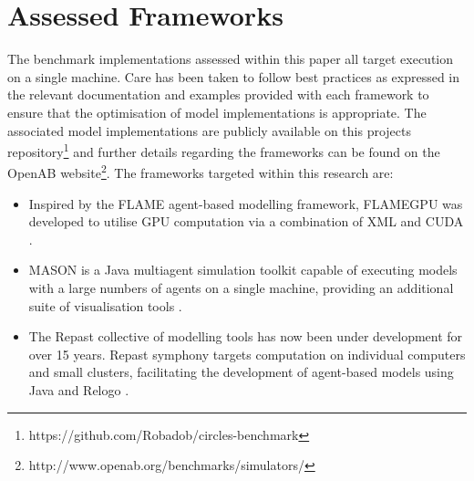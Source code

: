 \section{Assessed Frameworks\label{sec:assessed-frameworks}}
\vspace{-0.5cm}
The benchmark implementations assessed within this paper all target execution on a single machine. Care has been taken to follow best practices as expressed in the relevant documentation and examples provided with each framework to ensure that the optimisation of model implementations is appropriate. The associated model implementations are publicly available on this projects repository\footnote{https://github.com/Robadob/circles-benchmark} and further details regarding the frameworks can be found on the OpenAB website\footnote{http://www.openab.org/benchmarks/simulators/}.
The frameworks targeted within this research are:
\begin{itemize}
\item Inspired by the FLAME agent-based modelling framework, FLAMEGPU  was developed to utilise GPU computation via a combination of XML and CUDA \cite{RR082}. 
\item MASON is a Java multiagent simulation toolkit capable of executing models with a large numbers of agents on a single machine, providing an additional suite of visualisation tools \cite{LC*04}. 
\item The Repast collective of modelling tools has now been under development for over 15 years. Repast symphony targets computation on individual computers and small clusters, facilitating the development of agent-based models using Java and Relogo \cite{repsat2013}.
\end{itemize}
